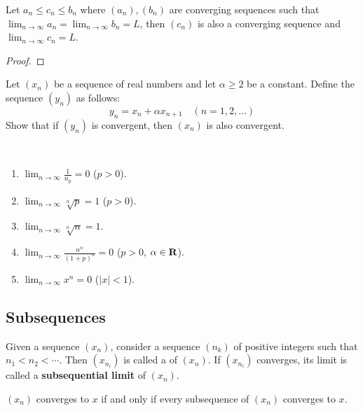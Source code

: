 \begin{theorem}
Let $a_n\le c_n\le b_n$ where $(a_n),(b_n)$ are converging sequences such that $\displaystyle\lim_{n\to\infty}a_n=\lim_{n\to\infty}b_n=L$, then $(c_n)$ is also a converging sequence and $\displaystyle\lim_{n\to\infty}c_n=L$.
\end{theorem}

\begin{proof}

\end{proof}

\begin{exercise}
Let $(x_n)$ be a sequence of real numbers and let $\alpha\ge2$ be a constant. Define the sequence $(y_n)$ as follows:
\[y_n=x_n+\alpha x_{n+1}\quad(n=1,2,\dots)\]
Show that if $(y_n)$ is convergent, then $(x_n)$ is also convergent.
\end{exercise}

\begin{exercise} \
\begin{enumerate}[label=(\arabic*)]
\item $\displaystyle\lim_{n\to\infty}\frac{1}{n_p}=0$ ($p>0$).
\item $\displaystyle\lim_{n\to\infty}\sqrt[n]{p}=1$ ($p>0$).
\item $\displaystyle\lim_{n\to\infty}\sqrt[n]{n}=1$.
\item $\displaystyle\lim_{n\to\infty}\frac{n^\alpha}{(1+p)^n}=0$ ($p>0$, $\alpha\in\mathbf R$).
\item $\displaystyle\lim_{n\to\infty}x^n=0$ ($|x|<1$).
\end{enumerate}
\end{exercise}

\subsection{Subsequences}
\begin{definition}[Subsequence]
Given a sequence $(x_n)$, consider a sequence $(n_k)$ of positive integers such that $n_1<n_2<\cdots$. Then $(x_{n_i})$ is called a  of $(x_n)$. If $(x_{n_i})$ converges, its limit is called a \textbf{subsequential limit} of $(x_n)$.
\end{definition}

\begin{proposition}
$(x_n)$ converges to $x$ if and only if every subsequence of $(x_n)$ converges to $x$.
\end{proposition}

